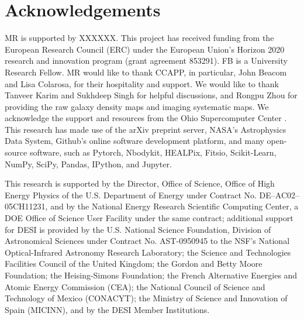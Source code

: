 \section*{Acknowledgements}
MR is supported by XXXXXX. This project has received funding from the European Research Council (ERC) under the European Union’s Horizon 2020 research and innovation program (grant agreement 853291). FB is a University Research Fellow. MR would like to thank CCAPP, in particular, John Beacom and Lisa Colarosa, for their hospitality and support. We would like to thank Tanveer Karim and Sukhdeep Singh for helpful discussions, and Rongpu Zhou for providing the raw galaxy density maps and imaging systematic maps. We acknowledge the support and resources from the Ohio Supercomputer Center \citep[OSC;][]{OhioSupercomputerCenter1987}. This research has made use of the arXiv preprint server, NASA’s Astrophysics Data System, Github's online software development platform, and many open-source software, such as Pytorch, Nbodykit, HEALPix, Fitsio, Scikit-Learn, NumPy, SciPy, Pandas, IPython, and Jupyter. 


This research is supported by the Director, Office of Science, Office of High Energy Physics of the U.S. Department of Energy under Contract No. DE–AC02–05CH11231, and by the National Energy Research Scientific Computing Center, a DOE Office of Science User Facility under the same contract; additional support for DESI is provided by the U.S. National Science Foundation, Division of Astronomical Sciences under Contract No. AST-0950945 to the NSF’s National Optical-Infrared Astronomy Research Laboratory; the Science and Technologies Facilities Council of the United Kingdom; the Gordon and Betty Moore Foundation; the Heising-Simons Foundation; the French Alternative Energies and Atomic Energy Commission (CEA); the National Council of Science and Technology of Mexico (CONACYT); the Ministry of Science and Innovation of Spain (MICINN), and by the DESI Member Institutions.

